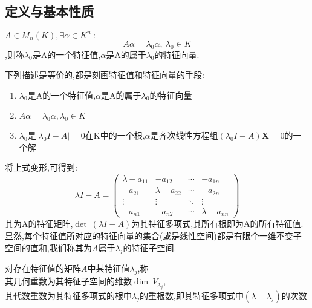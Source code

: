 \documentclass[UTF8,a4paper,notitlepage]{book}
\begin{document}
        \subsection{定义与基本性质}
        \begin{definition}[特征值和特征向量]
            $A\in M_n(K),\exists \alpha \in K^n~:$$$A\alpha =\lambda_0\alpha,~\lambda_0\in K$$,则称$\lambda_0$是A的一个特征值,$\alpha$是A的属于$\lambda_0$的特征向量.
            \end{definition}
        下列描述是等价的,都是刻画特征值和特征向量的手段:
        \begin{enumerate}
            \item $\lambda_0$是A的一个特征值,$\alpha$是A的属于$\lambda_0$的特征向量
            \item $A\alpha =\lambda_0\alpha,\lambda_0\in K$
            \item $\lambda_0$是$|\lambda_0I-A|=0$在K中的一个根,$\alpha$是齐次线性方程组$(\lambda_0I-A)\mathbf{X}=0$的一个解
        \end{enumerate}
        将上式变形,可得到:
            $$\lambda I-A=\begin{pmatrix}
                \lambda-a_{11}&-a_{12}&\cdots &-a_{1n}\\ -a_{21}&\lambda-a_{22}&\cdots &-a_{2n}\\\vdots&\vdots&\ddots &\vdots\\-a_{n1}&-a_{n2}&\cdots &\lambda-a_{nn}
            \end{pmatrix}$$
            其为A的特征矩阵,$\det~(\lambda I-A)$为其特征多项式,其所有根即为A的所有特征值.
        显然,每个特征值所对应的特征向量的集合(或是线性空间)都是有限个一维不变子空间的直和,我们称其为$A$属于$\lambda_j$的特征子空间.
        \begin{definition}[重数]
            对存在特征值的矩阵$A$中某特征值$\lambda_j$,称\\ 其几何重数为其特征子空间的维数$\dim~V_{\lambda_j}$,\\ 
            其代数重数为其特征多项式的根中$\lambda_j$的重根数,即其特征多项式中$(\lambda-\lambda_j)$的次数
        \end{definition}
\end{document}
